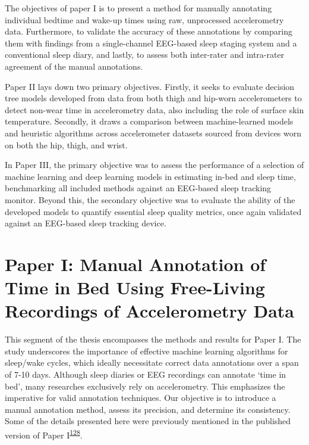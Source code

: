 \documentclass[
  10pt,
]{scrbook}
\begin{document}
The objectives of paper I is to present a method for manually annotating
individual bedtime and wake-up times using raw, unprocessed
accelerometry data. Furthermore, to validate the accuracy of these
annotations by comparing them with findings from a single-channel
EEG-based sleep staging system and a conventional sleep diary, and
lastly, to assess both inter-rater and intra-rater agreement of the
manual annotations.

Paper II lays down two primary objectives. Firstly, it seeks to evaluate
decision tree models developed from data from both thigh and hip-worn
accelerometers to detect non-wear time in accelerometry data, also
including the role of surface skin temperature. Secondly, it draws a
comparison between machine-learned models and heuristic algorithms
across accelerometer datasets sourced from devices worn on both the hip,
thigh, and wrist.

In Paper III, the primary objective was to assess the performance of a
selection of machine learning and deep learning models in estimating
in-bed and sleep time, benchmarking all included methods against an
EEG-based sleep tracking monitor. Beyond this, the secondary objective
was to evaluate the ability of the developed models to quantify
essential sleep quality metrics, once again validated against an
EEG-based sleep tracking device.

\hypertarget{paper-i-manual-annotation-of-time-in-bed-using-free-living-recordings-of-accelerometry-data}{%
\chapter{Paper I: Manual Annotation of Time in Bed Using Free-Living
Recordings of Accelerometry
Data}\label{paper-i-manual-annotation-of-time-in-bed-using-free-living-recordings-of-accelerometry-data}}

This segment of the thesis encompasses the methods and results for Paper
I. The study underscores the importance of effective machine learning
algorithms for sleep/wake cycles, which ideally necessitate correct data
annotations over a span of 7-10 days. Although sleep diaries or EEG
recordings can annotate `time in bed', many researches exclusively rely
on accelerometry. This emphasizes the imperative for valid annotation
techniques. Our objective is to introduce a manual annotation method,
assess its precision, and determine its consistency. Some of the details
presented here were previously mentioned in the published version of
Paper
I\textsuperscript{\protect\hyperlink{ref-skovgaard_manual_2021}{128}}.
\end{document}
